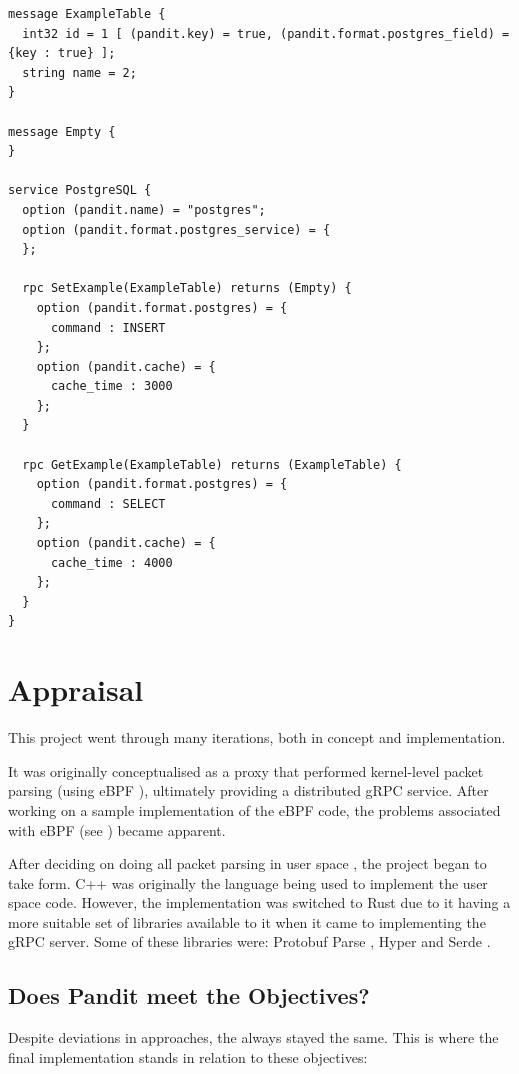 \documentclass[a4paper,12pt]{report}
\begin{document}
\begin{lstlisting}
message ExampleTable {
  int32 id = 1 [ (pandit.key) = true, (pandit.format.postgres_field) = {key : true} ];
  string name = 2;
}

message Empty {
}

service PostgreSQL {
  option (pandit.name) = "postgres";
  option (pandit.format.postgres_service) = {
  };

  rpc SetExample(ExampleTable) returns (Empty) {
    option (pandit.format.postgres) = {
      command : INSERT
    };
    option (pandit.cache) = {
      cache_time : 3000
    };
  }

  rpc GetExample(ExampleTable) returns (ExampleTable) {
    option (pandit.format.postgres) = {
      command : SELECT
    };
    option (pandit.cache) = {
      cache_time : 4000
    };
  }
}
\end{lstlisting}

\section{Appraisal}
This project went through many iterations, both in concept and implementation.

It was originally conceptualised as a proxy that performed kernel-level packet parsing (using eBPF \cite{ebpf}), ultimately providing a distributed gRPC service.
After working on a sample implementation of the eBPF code, the problems associated with eBPF (see \textit{}) became apparent.

After deciding on doing all packet parsing in user space \cite{userspace}, the project began to take form.
C++ was originally the language being used to implement the user space code. However, the implementation was switched to Rust due to it having a more suitable set of libraries available to it when it came to implementing the gRPC server. Some of these libraries were: Protobuf Parse \cite{parse}, Hyper \cite{hyper} and Serde \cite{serde}.

\subsection{Does Pandit meet the Objectives?}

Despite deviations in approaches, the  always stayed the same.
This is where the final implementation stands in relation to these objectives:
\end{document}
